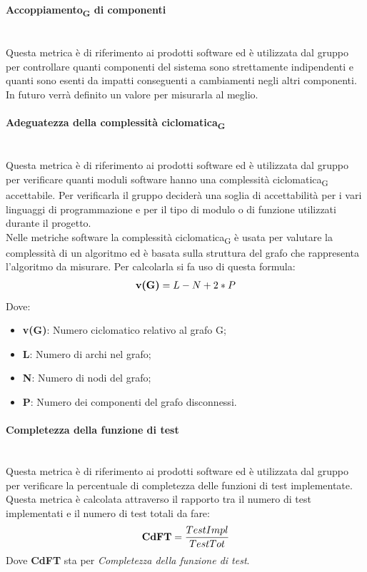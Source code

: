\paragraph{Accoppiamento\textsubscript{G} di componenti}\mbox{}\\
Questa metrica è di riferimento ai prodotti software ed è utilizzata dal gruppo per controllare quanti componenti del sistema sono strettamente  indipendenti e quanti sono esenti da impatti conseguenti a cambiamenti negli altri componenti.
In futuro verrà definito un valore per misurarla al meglio. 
\paragraph{Adeguatezza della complessità ciclomatica\textsubscript{G}}\mbox{}\\
Questa metrica è di riferimento ai prodotti software ed è utilizzata dal gruppo per verificare quanti moduli software hanno una complessità ciclomatica\textsubscript{G} accettabile. Per verificarla il gruppo deciderà una soglia di accettabilità per i vari linguaggi di programmazione e per il tipo di modulo o di funzione utilizzati durante il progetto.\\
Nelle metriche software la complessità ciclomatica\textsubscript{G} è usata per valutare la complessità di un algoritmo ed è basata sulla struttura del grafo che rappresenta l’algoritmo da misurare. Per calcolarla si fa uso di questa formula:
\begin{align*}
	\centering
	\textbf{v(G)} = L - N + 2 * P
\end{align*}
Dove:
\begin{itemize}
	\item \textbf{v(G)}: Numero ciclomatico relativo al grafo G;
	\item \textbf{L}: Numero di archi nel grafo;
	\item \textbf{N}: Numero di nodi del grafo;
	\item \textbf{P}: Numero dei componenti del grafo disconnessi.
\end{itemize}
\paragraph{Completezza della funzione di test}\mbox{}\\
Questa metrica è di riferimento ai prodotti software ed è utilizzata dal gruppo per verificare la percentuale di completezza delle funzioni di test implementate. Questa metrica è calcolata attraverso il rapporto tra il numero di test implementati e il numero di test totali da fare:
\begin{align*}
	\centering
	\textbf{CdFT} = \frac{TestImpl}{TestTot}
\end{align*}
Dove \textbf{CdFT} sta per \textit{Completezza della funzione di test}.

